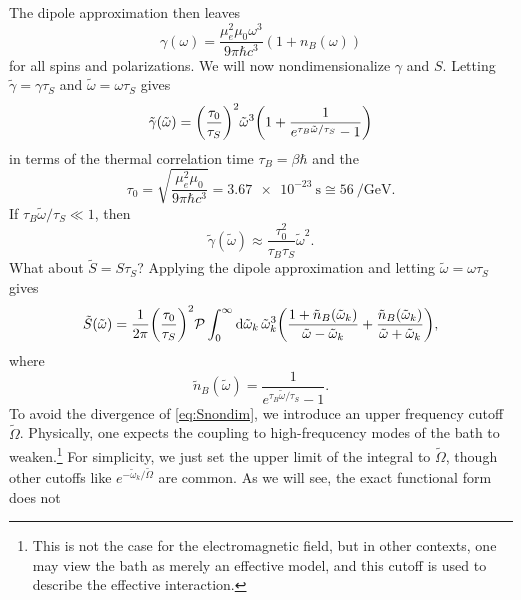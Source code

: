 \documentclass[../thesis.tex]{subfiles}
\begin{document}
The dipole approximation then leaves
\begin{equation}
  \gamma(\omega)
  = \frac{\mu_e^2\mu_0 \omega^3}{9\pi \hbar c^3}
  (1 + n_B(\omega))
  \label{eq:gamma-dipole}
\end{equation}
for all spins and polarizations. We will now nondimensionalize $\gamma$ and $S$.
Letting $\tilde{\gamma} = \gamma \tau_S$ and $\tilde{\omega} = \omega\tau_S$
gives
\begin{equation}
  \tilde{\gamma}(\tilde{\omega})
  = {\qty(\frac{\tau_0}{\tau_S})}^2 \tilde{\omega}^3
  \qty(1 + \frac{1}{e^{\tau_B \tilde{\omega} / \tau_S} - 1})
  \label{eq:gamma-nondim}
\end{equation}
in terms of the thermal correlation time $\tau_B = \beta\hbar$ and the
\begin{equation}
  \tau_0
  = \sqrt{\frac{\mu_e^2\mu_0}{9\pi \hbar c^3}}
  = \SI{3.67e-23}{\s}
  \cong \SI{56}{\per\GeV}.
\end{equation}
If $\tau_B\tilde{\omega}/\tau_S \ll 1$, then
\begin{equation}
  \tilde{\gamma}(\tilde{\omega})
  \approx \frac{\tau_0^2}{\tau_B \tau_S} \tilde{\omega}^2.
\end{equation}
What about $\tilde{S} = S\tau_S$? Applying the dipole approximation and letting
$\tilde{\omega} = \omega\tau_S$ gives 
\begin{equation}
  \tilde{S}(\tilde{\omega})
  = \frac{1}{2\pi} {\qty(\frac{\tau_0}{\tau_S})}^2
  \pv\int_0^\infty \dd{\tilde{\omega}_k} \tilde{\omega}_k^3
  \qty(\frac{1 + \tilde{n}_B(\tilde{\omega}_k)}{\tilde{\omega} - \tilde{\omega}_k}
  + \frac{\tilde{n}_B(\tilde{\omega}_k)}{\tilde{\omega} + \tilde{\omega}_k}),
  \label{eq:Snondim}
\end{equation}
where
\begin{equation}
  \tilde{n}_B(\tilde{\omega})
  = \frac{1}{e^{\tau_B \tilde{\omega} / \tau_S} - 1}.
\end{equation}
To avoid the divergence of \cref{eq:Snondim}, we introduce an upper frequency
cutoff $\tilde{\Omega}$. Physically, one expects the coupling to high-frequcency
modes of the bath to weaken.\footnote{%
  This is not the case for the electromagnetic field, but in other contexts, one
  may view the bath as merely an effective model, and this cutoff is used to
  describe the effective interaction.
}
For simplicity, we just set the upper limit of the
integral to $\tilde{\Omega}$, though other cutoffs like $e^{-\tilde{\omega}_k /
\tilde{\Omega}}$ are common. As we will see, the exact functional form does not
\end{document}
